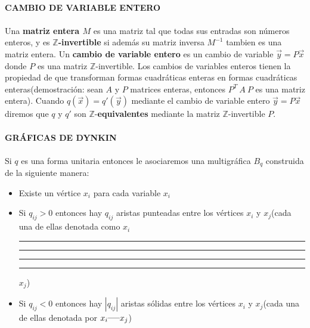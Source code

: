\paragraph*{}
\textbf{CAMBIO DE VARIABLE ENTERO}

\paragraph*{}
Una \textbf{matriz entera $M$} es una matriz tal que todas sus entradas son números enteros, y es $\mathbb{Z}$\textbf{-invertible} si además su matriz inversa $M^{-1}$ tambien es una matriz entera. Un \textbf{cambio de variable entero} es un cambio de variable $\overrightarrow{y} = P\overrightarrow{x}$ donde $P$ es una matriz $\mathbb{Z}$-invertible. Los cambios de variables enteros tienen la propiedad de que transforman formas cuadráticas enteras en formas cuadráticas enteras(demostración: sean $A$ y $P$ matrices enteras, entonces $P^{T}~A~P$ es una matriz entera). Cuando $q(\overrightarrow{x}) = q'(\overrightarrow{y})$ mediante el cambio de variable entero $\overrightarrow{y} = P\overrightarrow{x}$ diremos que $q$ y $q'$ son $\mathbb{Z}$-\textbf{equivalentes} mediante la matriz $\mathbb{Z}$-invertible $P$.

\paragraph*{}
\textbf{GRÁFICAS DE DYNKIN}

\paragraph*{}
Si $q$ es una forma unitaria entonces le asociaremos una multigráfica \textbf{$B$}$_{q}$ construida de la siguiente manera:

\begin{itemize}
    \item Existe un vértice $x_{i}$ para cada variable $x_{i}$
    \item Si $q_{ij} > 0$ entonces hay $q_{ij}$ aristas punteadas entre los vértices $x_{i}$ y $x_{j}$(cada una de ellas denotada como $x_{i}$ \rule[1mm]{.1cm}{0.4pt} \rule[1mm]{.1cm}{0.4pt} \rule[1mm]{.1cm}{0.4pt} \rule[1mm]{.1cm}{0.4pt} $x_{j}$)
    \item Si $q_{ij} < 0$ entonces hay $|q_{ij}|$ aristas sólidas entre los vértices $x_{i}$ y $x_{j}$(cada una de ellas denotada por $x_{i} \rule[1mm]{5mm}{0.1mm} x_{j}$)
\end{itemize}

